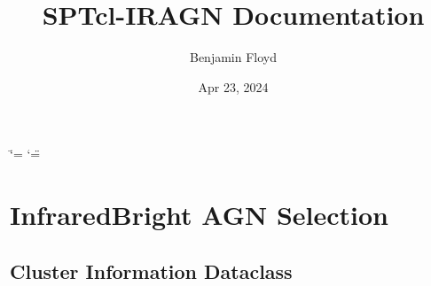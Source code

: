 \documentclass[letterpaper,12pt,english]{sphinxmanual}
\title{SPTcl-IRAGN Documentation}
\date{Apr 23, 2024}
\author{Benjamin Floyd}
\begin{document}
\ifdefined\shorthandoff
  \ifnum\catcode`\=\string=\active\shorthandoff{=}\fi
  \ifnum\catcode`\"=\active{}\fi
\fi

\pagestyle{empty}
\sphinxmaketitle
\pagestyle{plain}
\sphinxtableofcontents
\pagestyle{normal}
\label{\detokenize{index::doc}}


\sphinxstepscope


\chapter{Infrared\sphinxhyphen{}Bright AGN Selection}
\label{\detokenize{api/selector:infrared-bright-agn-selection}}\label{\detokenize{api/selector:selector}}\label{\detokenize{api/selector::doc}}

\section{Cluster Information Dataclass}
\label{\detokenize{api/selector:cluster-information-dataclass}}
\end{document}
